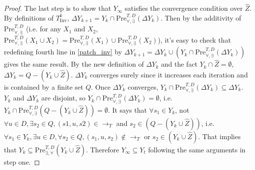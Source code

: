\begin{proof}
	The last step is to show that $ Y_{\infty} $ satisfies the convergence condition over $ \widehat{Z} $. By definitions of $ T_{\text{Inv}}^k $, $ \Delta Y_{k+1}= Y_k \cap \text{Pre}_{\forall,\exists}^{T, D}(\Delta Y_k)$. Then by the additivity of $ \text{Pre}^{T,D}_{\forall,\exists} $ (i.e. for any $ X_1 $ and $ X_2 $, $ \text{Pre}_{\forall,\exists}^{T,D} (X_1\cup X_2)=\text{Pre}_{\forall,\exists}^{T,D} (X_1)\cup \text{Pre}_{\forall,\exists}^{T,D} (X_2) $), it's easy to check that redefining fourth line in \eqref{patch_inv} by $ \Delta Y_{k+1} = \Delta Y_k \cup (Y_k \cap \text{Pre}_{\forall,\exists}^{T, D}(\Delta Y_k)) $ gives the same result.  By the new definition of $ \Delta Y_k $ and the fact $ Y_k \cap \widehat{Z} = \emptyset $, $ \Delta Y_k = Q-(Y_k\cup \widehat{Z}) $. $ \Delta Y_k $ converges surely since it increases each iteration and is contained by a finite set $ Q $. Once $ \Delta Y_k $ converges, $ Y_k \cap \text{Pre}_{\forall,\exists}^{T, D}(\Delta Y_k)\subseteq \Delta Y_k $. $ Y_k $ and $ \Delta Y_k $ are disjoint, so $ Y_k \cap \text{Pre}_{\forall,\exists}^{T, D}(\Delta Y_k) = \emptyset $, i.e.  $ Y_k \cap \text{Pre}_{\forall,\exists}^{T, D}(Q-(Y_k\cup \widehat{Z})) = \emptyset $. It says that $ \forall s_1 \in Y_k$, not $\forall u\in D, \exists s_2\in Q, (s1,u,s2)\in \rightarrow_{T} $ and $s_2\in (Q-(Y_k\cup \widehat{Z}))$, i.e. $ \forall s_1 \in Y_k, \exists u\in D, \forall s_2 \in Q,  (s_1,u,s_2)\not\in \rightarrow_{T}$ or $ s_2\in (Y_k\cup \widehat{Z})$. That implies that $ Y_k\subseteq \text{Pre}_{\exists,\forall}^{T,D}(Y_k\cup \widehat{Z}) $. Therefore $ Y_{\infty}\subseteq Y_t $ following the same arguments in step one.
\end{proof}
\fi